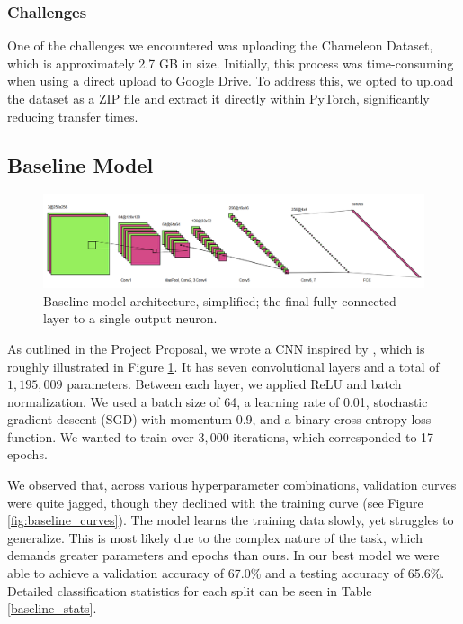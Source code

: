 \documentclass{article} %
\begin{document}
\subsubsection{Challenges}
One of the challenges we encountered was uploading the Chameleon Dataset, which is approximately 2.7 GB in size. Initially, this process was time-consuming when using a direct upload to Google Drive. To address this, we opted to upload the dataset as a ZIP file and extract it directly within PyTorch, significantly reducing transfer times.

\subsection{Baseline Model}

\begin{figure}[h]
    \begin{center}
        \includegraphics[scale=0.45]{figs/baseline.png}
    \end{center}
    \caption{Baseline model architecture, simplified; the final fully connected layer to a single output neuron.}
    \label{fig:baseline_arch}
\end{figure}

As outlined in the Project Proposal, we wrote a CNN inspired by \citet{wang2020cnngeneratedimagessurprisinglyeasy}, which is roughly illustrated in Figure \ref{fig:baseline_arch}. It has seven convolutional layers and a total of $1,195,009$ parameters. Between each layer, we applied ReLU and batch normalization. We used a batch size of 64, a learning rate of 0.01, stochastic gradient descent (SGD) with momentum 0.9, and a binary cross-entropy loss function. We wanted to train over $3,000$ iterations, which corresponded to 17 epochs.

We observed that, across various hyperparameter combinations, validation curves were quite jagged, though they declined with the training curve (see Figure \ref{fig:baseline_curves}). The model learns the training data slowly, yet struggles to generalize. This is most likely due to the complex nature of the task, which demands greater parameters and epochs than ours. In our best model we were able to achieve a validation accuracy of 67.0\% and a testing accuracy of 65.6\%. Detailed classification statistics for each split can be seen in Table \ref{baseline_stats}.
\end{document}
